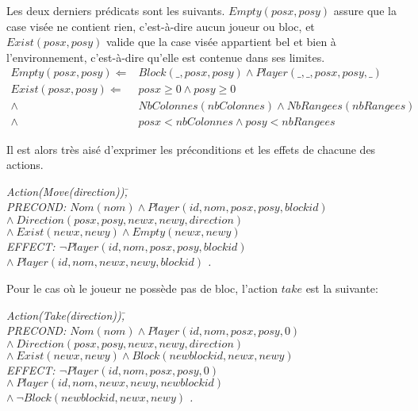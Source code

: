 \documentclass[12pt,english,frenchb,letterpaper]{article}
\begin{document}
Les deux derniers prédicats sont les suivants.  $Empty(posx,posy)$ assure que la case visée ne contient rien, c'est-à-dire aucun joueur ou bloc, et $Exist(posx,posy)$ valide que la case visée appartient bel et bien à l'environnement, c'est-à-dire qu'elle est contenue dans ses limites.
\begin{eqnarray*}
	Empty(posx,posy) \Leftarrow & Block(\_,posx,posy)  \wedge Player(\_,\_,posx,posy,\_) \\
	Exist(posx,posy) \Leftarrow & posx  \geq 0 \wedge posy \geq 0 \\
	                                                    \wedge & NbColonnes(nbColonnes)  \wedge NbRangees(nbRangees) \\
	                                                   \wedge & posx < nbColonnes \wedge posy < nbRangees 
\end{eqnarray*}

Il est alors très aisé d'exprimer les préconditions et les effets de chacune des actions.

\begin{tabbing}
\it{Action}\=\it{(Move(direction))}\=,\\
\> PRECOND: \> $Nom(nom) \wedge Player(id,nom,posx,posy,blockid)$ \\ 
\> \> $  \wedge \ Direction(posx,posy,newx,newy,direction) $ \\
\> \> $   \wedge \ Exist(newx,newy) \wedge Empty(newx,newy) $ \\               
\> EFFECT: \>$ \lnot Player(id,nom,posx,posy,blockid) $ \\
\>  \> $\wedge\ Player(id,nom,newx,newy,blockid)$ .\\
\end{tabbing}

Pour le cas où le joueur ne possède pas de bloc, l'action $take$ est la suivante:

\begin{tabbing}
\it{Action}\=\it{(Take(direction))}\=,\\
\> PRECOND: \> $Nom(nom) \wedge Player(id,nom,posx,posy,0)$ \\ 
\> \> $  \wedge \ Direction(posx,posy,newx,newy,direction) $ \\
\> \> $   \wedge \ Exist(newx,newy) \wedge Block(newblockid,newx,newy) $ \\               
\> EFFECT: \>$ \lnot Player(id,nom,posx,posy,0) $ \\
\>  \> $\wedge\ Player(id,nom,newx,newy,newblockid)$ \\
\> \> $\wedge\ \lnot Block(newblockid,newx,newy) $ .\\
\end{tabbing}
\end{document}
